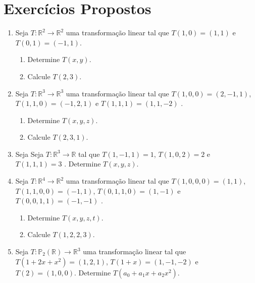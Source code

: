 \section{Exercícios Propostos}
\begin{enumerate}

\item Seja $T: \mathbb{R}^2 \rightarrow \mathbb{R}^2$  uma transformação linear tal que $T(1,0)=(1,1)$ e $T(0,1)=(-1,1)$.
\begin{enumerate}[label=(\alph*)]
\item Determine $T(x,y)$.
\item Calcule $T(2,3)$.
\end{enumerate}

\item Seja $T: \mathbb{R}^3 \rightarrow \mathbb{R}^3$  uma transformação linear tal que $T(1,0,0)=(2,-1,1)$,  $T(1,1, 0)=(-1,2,1)$  e $T(1,1, 1)=(1,1,-2)$ .
\begin{enumerate}[label=(\alph*)]
\item Determine $T(x,y,z)$.
\item Calcule $T(2,3,1)$.
\end{enumerate}

\item Seja  Seja $T: \mathbb{R}^3 \rightarrow \mathbb{R}$ tal que  $T(1,-1,1)=1$,  $T(1,0, 2)=2 $  e $T(1,1, 1)=3$ . Determine $T(x,y,z)$.

\item Seja $T: \mathbb{R}^4 \rightarrow \mathbb{R}^2$  uma transformação linear tal que  $T(1,0,0, 0)=(1,1)$, $T(1,1,0,0)=(-1,1)$,  $T(0,1,1, 0)=(1,-1)$ e   $T(0,0,1, 1)=(-1,-1)$ .
\begin{enumerate}[label=(\alph*)]
\item Determine $T(x,y,z,t)$.
\item Calcule $T(1,2,2,3)$.
\end{enumerate}

\item Seja $T: \mathbb{P}_2(\mathbb{R}) \rightarrow \mathbb{R}^3$  uma transformação linear tal que  $T(1+2x+x^2)=(1,2,1)$, $T(1+x)=(1,-1,-2)$ e  $T(2)=(1,0,0)$. Determine $T(a_0+a_1x+a_2x^2)$.
\end{enumerate}

